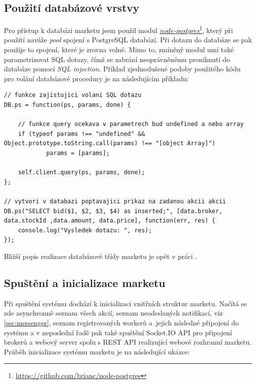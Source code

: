 \documentclass[thesis=M,czech]{FITthesis}[2012/06/26]
\newcommand\fnurl[2]{\href{#2}{#1}\footnote{\url{#2}}}
\begin{document}
\subsection{Použití databázové vrstvy}
	
	Pro přístup k databázi marketu jsem použil modul \fnurl{\textit{node-postgres}}{https://github.com/brianc/node-postgres}, který při použití naváže \textit{pool} spojení s PostgreSQL databází. Při dotazu do databáze se pak použije  to spojení, které je zrovna volné. Mimo to, zmíněný modul umí také parametrizovat SQL dotazy, čímž se zabrání neoprávněnému proniknutí do databáze pomocí \textit{SQL injection}. Příklad zjednodušené podoby použitého kódu pro volání databázové procedury je na následujícím příkladu:


\begin{lstlisting}[basicstyle={\tiny\ttfamily}, frame=single] 
// funkce zajistujici volani SQL dotazu
DB.ps = function(ps, params, done) {
		
	// funkce query ocekava v parametrech bud undefined a nebo array
	if (typeof params !== "undefined" && Object.prototype.toString.call(params) !== "[object Array]")
            params = [params];

    self.client.query(ps, params, done);
};

// vytvori v databazi poptavajici prikaz na zadanou akcii akcii
DB.ps("SELECT bid($1, $2, $3, $4) as inserted;", [data.broker, data.stockId ,data.amount, data.price], function(err, res) {
	console.log("Vysledek dotazu: ", res);
});
\end{lstlisting}
	
	Bližší popis realizace databázové třídy marketu je opět v práci \cite{Fremunt2014}.

\subsection{Spuštění a inicializace marketu}

	Při spuštění systému dochází k inicializaci vnitřních struktur marketu. Načítá se zde asynchronně seznam všech akcií, seznam neodeslaných notifikací, viz \ref{sec:messenger}, seznam registrovaných workerů a~jejich následné připojení do systému a v neposlední řadě pak také spuštění Socket.IO API pro připojení brokerů a webový server spolu s REST API realizující webové rozhranní marketu. Průběh inicializace systému marketu je na následující ukázce:
\end{document}

